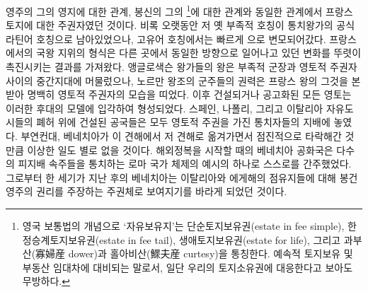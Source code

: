 영주의 그의 영지에 대한 관계, 봉신의 그의 \footnote{%
  영국 보통법의 개념으로 `자유보유지'는
  단순토지보유권(estate in fee simple),
  한정승계토지보유권(estate in fee tail),
  생애토지보유권(estate for life),
  그리고 과부산(寡婦産 dower)과 홀아비산(鰥夫産 curtesy)을 통칭한다.
  예속적 토지보유 및 부동산 임대차에 대비되는 말로서,
  일단 우리의 토지소유권에 대응한다고 보아도 무방하다.
}에 대한 관계와
동일한 관계에서 프랑스 토지에 대한 주권자였던 것이다.
비록 오랫동안 저 옛 부족적 호칭이 통치왕가의 공식 라틴어 호칭으로 남아있었으나,
고유어 호칭에서는 빠르게 으로 변모되어갔다.
프랑스에서의 국왕 지위의 형식은 다른 곳에서 동일한 방향으로 일어나고 있던
변화를 뚜렷이 촉진시키는 결과를 가져왔다.
앵글로색슨 왕가들의 왕은 부족적 군장과 영토적 주권자 사이의
중간지대에 머물렀으나,
노르만 왕조의 군주들의 권력은 프랑스 왕의 그것을 본받아 명백히
영토적 주권자의 모습을 띠었다.
이후 건설되거나 공고화된 모든 영토는 이러한 후대의 모델에 입각하여 형성되었다.
스페인, 나폴리, 그리고 이탈리아 자유도시들의 폐허 위에 건설된
공국들은 모두 영토적 주권을 가진 통치자들의 지배에 놓였다.
부연컨대, 베네치아가 이 견해에서 저 견해로 옮겨가면서 점진적으로
타락해간 것만큼 이상한 일도 별로 없을 것이다.
해외정복을 시작할 때의 베네치아 공화국은
다수의 피지배 속주들을 통치하는
로마 국가 체제의 예시의 하나로
스스로를
간주했었다.
그로부터 한 세기가 지난 후의 베네치아는
이탈리아와 에게해의 점유지들에 대해
봉건영주의 권리를 주장하는 주권체로 보여지기를
바라게 되었던 것이다.

